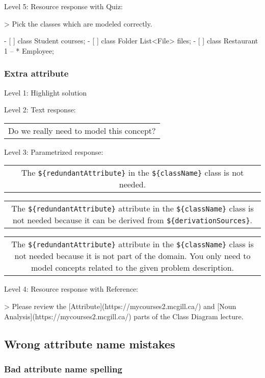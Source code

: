 \noindent Level 5: Resource response with Quiz:

> Pick the classes which are modeled correctly.

- [ ] class Student { courses; }
- [ ] class Folder { List<File> files; }
- [ ] class Restaurant { 1 -- * Employee; }


\subsubsection{Extra attribute}

\noindent Level 1: Highlight solution \medskip

\noindent Level 2: Text response: \medskip

\begin{tabular}{|c}
Do we really need to model this concept?
\end{tabular} \medskip

\noindent Level 3: Parametrized response: \medskip

\begin{tabular}{|c}
The \verb|${redundantAttribute}| in the \verb|${className}| class is not needed.
\end{tabular} \medskip

\begin{tabular}{|c}
The \verb|${redundantAttribute}| attribute in the \verb|${className}| class is not needed because it can be derived from \verb|${derivationSources}|.
\end{tabular} \medskip

\begin{tabular}{|c}
The \verb|${redundantAttribute}| attribute in the \verb|${className}| class is not needed because it is not part of the domain. You only need to model concepts related to the given problem description.
\end{tabular} \medskip

\noindent Level 4: Resource response with Reference:

> Please review the [Attribute](https://mycourses2.mcgill.ca/) and [Noun Analysis](https://mycourses2.mcgill.ca/) parts of the Class Diagram lecture.


\subsection{Wrong attribute name mistakes}

\subsubsection{Bad attribute name spelling}

